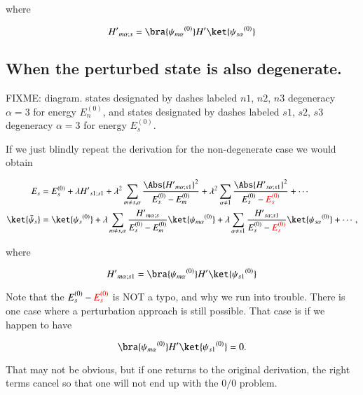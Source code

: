 where

\begin{equation}\label{eqn:qmTwoL5:30}
{H'}_{m \alpha ; s} =
\bra{{\psi_{m \alpha}}^{(0)}} H' \ket{{\psi_{s \alpha}}^{(0)}}
\end{equation}

\subsection{When the perturbed state is also degenerate.}

FIXME: diagram.  states designated by dashes labeled $n1$, $n2$, $n3$ degeneracy $\alpha = 3$ for energy $E_n^{(0)}$, and states designated by dashes labeled $s1$, $s2$, $s3$ degeneracy $\alpha = 3$ for energy $E_s^{(0)}$.

If we just blindly repeat the derivation for the non-degenerate case we would obtain

\begin{align}\label{eqn:qmTwoL5:50}
E_s &= E_s^{(0)} + \lambda {H'}_{s1 ; s1} 
+ \lambda^2 
\sum_{m \ne s, \alpha} 
\frac{\Abs{{H'}_{m \alpha ; s1}}^2 }
{ E_s^{(0)} - E_m^{(0)} } 
+ \lambda^2 
\sum_{\alpha \ne 1} 
\frac{\Abs{{H'}_{s \alpha ; s1}}^2 }
{ E_s^{(0)} - \color{red}{E_s^{(0)}} } 
+ \cdots
\\
\ket{\bar{\psi}_s} &= \ket{{\psi_s}^{(0)}} 
+ \lambda
\sum_{m \ne s, \alpha} 
\frac{{H'}_{m \alpha ; s}}
{ E_s^{(0)} - E_m^{(0)} } \ket{{\psi_{m \alpha}}^{(0)}}
+ \lambda
\sum_{\alpha \ne s1} 
\frac{{H'}_{s \alpha ; s1}}
{ E_s^{(0)} - \color{red}{E_s^{(0)}} } \ket{{\psi_{s \alpha}}^{(0)}}
+ \cdots,
\end{align}

where

\begin{equation}\label{eqn:qmTwoL5:70}
{H'}_{m \alpha ; s1} =
\bra{{\psi_{m \alpha}}^{(0)}} H' \ket{{\psi_{s1}}^{(0)}}
\end{equation}

Note that the $E_s^{(0)} -\color{red}{E_s^{(0)}}$ is NOT a typo, and why we run into trouble.  There is one case where a perturbation approach is still possible.  That case is if we happen to have

\begin{equation}\label{eqn:qmTwoL5:90}
\bra{{\psi_{m \alpha}}^{(0)}} H' \ket{{\psi_{s1}}^{(0)}} = 0.
\end{equation}

That may not be obvious, but if one returns to the original derivation, the right terms cancel so that one will not end up with the $0/0$ problem.

